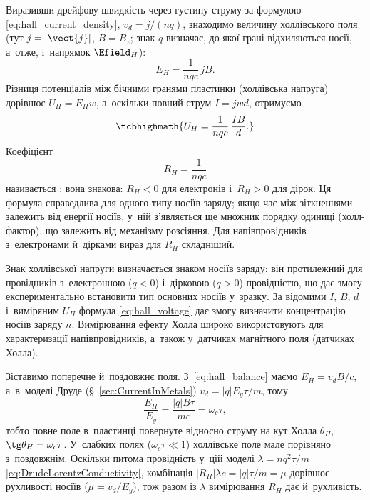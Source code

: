 Виразивши дрейфову швидкість через густину струму за формулою \eqref{eq:hall_current_density}, $v_d = j/(nq)$, знаходимо величину холлівського поля (тут $j = |\vect{j}|$, $B = B_z$; знак $q$ визначає, до якої грані відхиляються носії, а~отже, і~напрямок $\Efield_H$):
\begin{equation}\label{eq:hall_field}
	E_H = \frac{1}{nqc}\,jB.
\end{equation}
Різниця потенціалів між бічними гранями пластинки (холлівська напруга) дорівнює $U_H = E_H w$, а~оскільки повний струм $I = jwd$, отримуємо
\begin{equation}\label{eq:hall_voltage}
	\tcbhighmath{
		U_H = \frac{1}{nqc}\,\frac{IB}{d}.
	}
\end{equation}
Коефіцієнт
\begin{equation}\label{eq:hall_coefficient}
	R_H = \frac{1}{nqc}
\end{equation}
називається ; вона знакова: $R_H < 0$ для електронів і~$R_H > 0$ для дірок. Ця формула справедлива для одного типу носіїв заряду; якщо час між зіткненнями залежить від енергії носіїв, у~ній з'являється ще множник порядку одиниці (холл-фактор), що залежить від механізму розсіяння. Для напівпровідників з~електронами й~дірками вираз для $R_H$ складніший.

Знак холлівської напруги визначається знаком носіїв заряду: він протилежний для провідників з~електронною ($q<0$) і~дірковою ($q>0$) провідністю, що дає змогу експериментально встановити тип основних носіїв у~зразку. За відомими $I$, $B$, $d$ і~виміряним $U_H$ формула \eqref{eq:hall_voltage} дає змогу визначити концентрацію носіїв заряду $n$. Вимірювання ефекту Холла широко використовують для характеризації напівпровідників, а~також у~датчиках магнітного поля (датчиках Холла).

Зіставимо поперечне й~поздовжнє поля. З~\eqref{eq:hall_balance} маємо $E_H = v_dB/c$, а~в~моделі Друде (\S~\ref{sec:CurrentInMetals}) $v_d = |q|E_y\tau/m$, тому
\begin{equation}
	\frac{E_H}{E_y} = \frac{|q|B\tau}{mc} = \omega_c\tau,
\end{equation}
тобто повне поле в~пластинці повернуте відносно струму на кут Холла $\theta_H$, $\tg\theta_H = \omega_c\tau$. У~слабких полях ($\omega_c\tau \ll 1$) холлівське поле мале порівняно з~поздовжнім. Оскільки питома провідність у~цій моделі $\lambda = nq^2\tau/m$ \eqref{eq:DrudeLorentzConductivity}, комбінація $|R_H|\lambda c = |q|\tau/m = \mu$ дорівнює рухливості носіїв ($\mu = v_d/E_y$), тож разом із $\lambda$ вимірювання $R_H$ дає й~рухливість.

